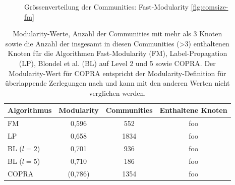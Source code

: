 \begin{figure}[t]
  \caption{Gr\"ossenverteilung der Communities: Fast-Modularity \ref{fig:comsize-fm}}
  \label{fig:comsizedist}
\end{figure}


\begin{table}[h]
  \centering
  \footnotesize
  \begin{tabular}{l|c|c|c}
    Algorithmus & Modularity & Communities &
    Enthaltene Knoten \\
    \hline
    FM & 0,596 & 552 & foo \\
    LP & 0,658 & 1834 & foo \\
    BL ($l=2$)& 0,701 & 936 & foo \\
    BL ($l=5$)& 0,710 & 186 & foo \\
    COPRA & (0,786) & 1354 & foo
  \end{tabular}
  \caption{Modularity-Werte, Anzahl der Communities mit mehr als 3
    Knoten sowie die Anzahl der insgesamt in diesen Communities (>3) enthaltenen
    Knoten 
    f\"ur die Algorithmen Fast-Modularity (FM), Label-Propagation
    (LP), Blondel et al. (BL) auf Level 2 und 5 sowie COPRA. Der
    Modularity-Wert f\"ur COPRA entspricht der Modularity-Definition
    f\"ur \"uberlappende Zerlegungen nach \cite{Nicosia2009} und kann mit den anderen
    Werten nicht verglichen werden.}
  \label{tab:foo}
\end{table}

